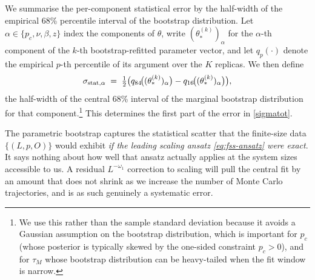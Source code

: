 \documentclass[pra,aps,twocolumn,groupedaddress,superscriptaddress,nofootinbib,preprintnumbers]{revtex4-2}
\begin{document}
\begin{widetext}
		We summarise the per-component statistical error by the half-width of
		the empirical 68\% percentile interval of the bootstrap distribution.
		Let $\alpha \in \{p_c, \nu, \beta, z\}$ index the components of
		$\theta$, write $(\theta_*^{(k)})_\alpha$ for the $\alpha$-th component
		of the $k$-th bootstrap-refitted parameter vector, and let $q_p(\cdot)$
		denote the empirical $p$-th percentile of its argument over the $K$
		replicas. We then define
		\begin{equation}
			\sigma_{{\rm stat},\alpha}
			\;=\;
			\tfrac12\bigl(q_{84}\!\bigl((\theta_*^{(k)})_\alpha\bigr) -
			q_{16}\!\bigl((\theta_*^{(k)})_\alpha\bigr)\bigr),
			\label{eq:sigma-stat}
		\end{equation}
		the half-width of the central 68\% interval of the marginal
		bootstrap distribution for that component.\footnote{We use this rather than the sample
			standard deviation because it avoids a
			Gaussian assumption on the bootstrap distribution, which is important
			for $p_c$ (whose posterior is typically skewed by the one-sided
			constraint $p_c > 0$), and for $\tau_M$ whose bootstrap
			distribution can be heavy-tailed when the fit window is narrow. }  This determines the first part of the error in \eqref{sigmatot}. 
		
		\label{sec:sys-loo}
		
		The parametric bootstrap captures the statistical scatter that the
		finite-size data $\{(L,p,O)\}$ would exhibit \emph{if the leading
			scaling ansatz \eqref{eq:fss-ansatz} were exact}. It says nothing about
		how well that ansatz actually applies at the system sizes accessible
		to us. A residual $L^{-\omega_1}$ correction to scaling will pull the central fit by an amount that does not shrink as we increase the number of Monte Carlo trajectories, and is as such
		genuinely a systematic error.
		

\end{widetext}
\end{document}
